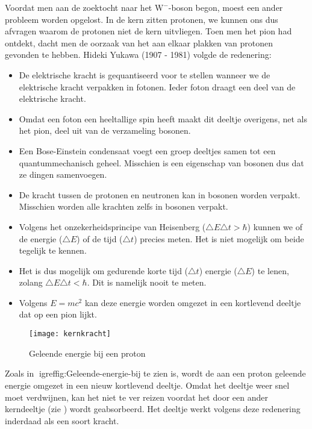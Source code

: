 Voordat men aan de zoektocht naar het $\mathrm{W}^{-}$-boson begon,
moest een ander probleem worden opgelost. In de kern zitten protonen,
we kunnen ons dus afvragen waarom de protonen niet de kern uitvliegen.
Toen men het pion had ontdekt, dacht men de oorzaak van het aan elkaar
plakken van protonen gevonden te hebben. Hideki Yukawa (1907 - 1981)
volgde de redenering:
\begin{itemize}
\item De elektrische kracht is gequantiseerd voor te stellen wanneer we
de elektrische kracht verpakken in fotonen. Ieder foton draagt een
deel van de elektrische kracht. 
\item Omdat een foton een heeltallige spin heeft maakt dit deeltje overigens,
net als het pion, deel uit van de verzameling bosonen.
\item Een Bose-Einstein condensaat voegt een groep deeltjes samen tot een
quantummechanisch geheel. Misschien is een eigenschap van bosonen
dus dat ze dingen samenvoegen.
\item De kracht tussen de protonen en neutronen kan in bosonen worden verpakt.
Misschien worden alle krachten zelfs in bosonen verpakt.
\item Volgens het onzekerheidsprincipe van Heisenberg ($\triangle E\triangle t>\hbar$)
kunnen we of de energie ($\triangle E$) of de tijd ($\triangle t$)
precies meten. Het is niet mogelijk om beide tegelijk te kennen.
\item Het is dus mogelijk om gedurende korte tijd ($\triangle t$) energie
($\triangle E$) te lenen, zolang $\triangle E\triangle t<\hbar$.
Dit is namelijk nooit te meten.
\item Volgens $E=mc^{2}$ kan deze energie worden omgezet in een kortlevend
deeltje dat op een pion lijkt.
\end{itemize}
\begin{figure}[h]
\noindent \begin{centering}
\texttt{[image: kernkracht]}
\par\end{centering}

\caption{\label{fig:Geleende-energie-bij}Geleende energie bij een proton}
\end{figure}


Zoals in igref{fig:Geleende-energie-bij} te zien is, wordt de aan
een proton geleende energie omgezet in een nieuw kortlevend deeltje.
Omdat het deeltje weer snel moet verdwijnen, kan het niet te ver reizen
voordat het door een ander kerndeeltje (zie
) wordt geabsorbeerd. Het deeltje werkt
volgens deze redenering inderdaad als een soort kracht. 

